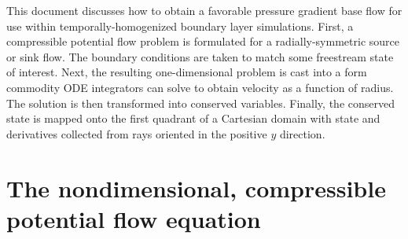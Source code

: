 \documentclass[letterpaper,11pt,nointlimits,reqno]{amsart}
\begin{document}
This document discusses how to obtain a favorable pressure gradient base flow
for use within temporally-homogenized boundary layer simulations.  First, a
compressible potential flow problem is formulated for a radially-symmetric
source or sink flow.  The boundary conditions are taken to match some
freestream state of interest.  Next, the resulting one-dimensional problem is
cast into a form commodity ODE integrators can solve to obtain velocity as a
function of radius.  The solution is then transformed into conserved variables.
Finally, the conserved state is mapped onto the first quadrant of a Cartesian
domain with state and derivatives collected from rays oriented in the positive
$y$ direction.

\section{The nondimensional, compressible potential flow equation}
\end{document}
